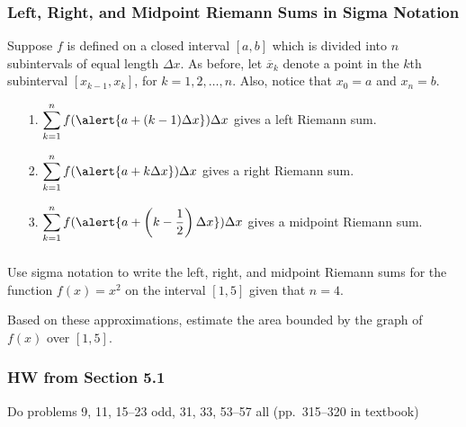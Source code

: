 \documentclass[14pt]{beamer}
\newcommand{\dsum}{\displaystyle\sum}
\begin{document}
\begin{frame}
\frametitle{\small Left, Right, and Midpoint Riemann Sums in Sigma Notation}
\footnotesize
Suppose $f$ is defined on a closed interval $[a,b]$ which is divided into $n$ subintervals of equal length $\Delta x$.  As before, let $\overline{x}_k$ denote a point in the $k$th subinterval $[x_{k-1},x_k]$, for $k=1,2,\dots,n$.  Also, notice that $x_0=a$ and $x_n=b$. 

\begin{itemize}
\item[1.] $\dsum_{k=1}^n f(\alert{a+(k-1)\Delta x}) \Delta x$ gives a left Riemann sum.
\item[2.] $\dsum_{k=1}^n f(\alert{a+k\Delta x}) \Delta x$ gives a right Riemann sum.
\item[3.] $\dsum_{k=1}^n f(\alert{a+\left(k-\dfrac{1}{2}\right)\Delta x}) \Delta x$ gives a midpoint Riemann sum.
\end{itemize}
\end{frame}

\begin{frame}%
\frametitle{}
\begin{exe} Use sigma notation to write the left, right, and midpoint Riemann sums for the function $f(x)=x^2$ on the interval $[1,5]$ given that $n=4$.

\vspace{1pc}
Based on these approximations, estimate the area bounded by the graph of $f(x)$ over $[1,5]$.
\end{exe}
\end{frame}

\begin{frame}
\frametitle{HW from Section 5.1}
Do problems 9, 11, 15--23 odd, 31, 33, 53--57 all (pp.\ 315--320 in textbook)
\end{frame}

\begin{comment}
\end{comment}
\end{document}
